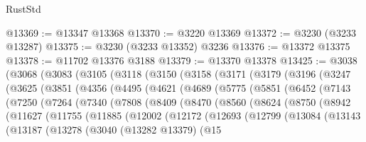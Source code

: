 \begin{lexlean}{RustStd}
\begin{coremodule}
@13369 := @13347 @13368
@13370 := @3220 @13369
@13372 := @3230 (@3233 @13287)
@13375 := @3230 (@3233 @13352) @3236
@13376 := @13372 @13375
@13378 := @11702 @13376 @3188
@13379 := @13370 @13378
@13425 := @3038
    (@3068
      (@3083
        (@3105
          (@3118
            (@3150
              (@3158
                (@3171
                  (@3179
                    (@3196
                      (@3247
                        (@3625
                          (@3851
                            (@4356
                              (@4495
                                (@4621
                                  (@4689
                                    (@5775
                                      (@5851
                                        (@6452
                                          (@7143
                                            (@7250
                                              (@7264
                                                (@7340
                                                  (@7808
                                                    (@8409
                                                      (@8470
                                                        (@8560
                                                          (@8624
                                                            (@8750
                                                              (@8942
                                                                (@11627
                                                                  (@11755
                                                                    (@11885
                                                                      (@12002
                                                                        (@12172
                                                                          (@12693
                                                                            (@12799
                                                                              (@13084
                                                                                (@13143
                                                                                  (@13187
                                                                                    (@13278
                                                                                      (@3040
                                                                                        (@13282
                                                                                          @13379)
                                                                                        (@15

\end{coremodule}
\end{lexlean}
